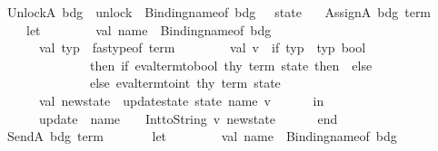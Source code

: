\begin{isabellebody}
\ \ {\isacharbar}{\kern0pt}\ UnlockA\ bdg\ {\isacharequal}{\kern0pt}{\isachargreater}{\kern0pt}\ {\isacharparenleft}{\kern0pt}{\isachardoublequote}{\kern0pt}unlock{\isacharunderscore}{\kern0pt}{\isachardoublequote}{\kern0pt}\ {\isacharcircum}{\kern0pt}\ Binding{\isachardot}{\kern0pt}name{\isacharunderscore}{\kern0pt}of\ bdg\ {\isacharcircum}{\kern0pt}\ {\isachardoublequote}{\kern0pt}{\isacharbang}{\kern0pt}{}{\isachardoublequote}{\kern0pt}{\isacharcomma}{\kern0pt}\ state{\isacharparenright}{\kern0pt}\isanewline
\ \ {\isacharbar}{\kern0pt}\ AssignA\ {\isacharparenleft}{\kern0pt}bdg{\isacharcomma}{\kern0pt}\ term{\isacharparenright}{\kern0pt}\ {\isacharequal}{\kern0pt}{\isachargreater}{\kern0pt}\isanewline
\ \ \ \ \ \ let\isanewline
\ \ \ \ \ \ \ \ val\ name\ {\isacharequal}{\kern0pt}\ Binding{\isachardot}{\kern0pt}name{\isacharunderscore}{\kern0pt}of\ bdg\isanewline
\ \ \ \ \ \ \ \ val\ typ\ {\isacharequal}{\kern0pt}\ fastype{\isacharunderscore}{\kern0pt}of\ term\isanewline
\ \ \ \ \ \ \ \ val\ v\ {\isacharequal}{\kern0pt}\ if\ typ\ {\isacharequal}{\kern0pt}\ {\isacharat}{\kern0pt}{\isacharbraceleft}{\kern0pt}typ\ bool{\isacharbraceright}{\kern0pt}\isanewline
\ \ \ \ \ \ \ \ \ \ \ \ \ \ \ \ then\ if\ eval{\isacharunderscore}{\kern0pt}term{\isacharunderscore}{\kern0pt}to{\isacharunderscore}{\kern0pt}bool\ thy\ term\ state\ then\ {}\ else\ {}\isanewline
\ \ \ \ \ \ \ \ \ \ \ \ \ \ \ \ else\ eval{\isacharunderscore}{\kern0pt}term{\isacharunderscore}{\kern0pt}to{\isacharunderscore}{\kern0pt}int\ thy\ term\ state\isanewline
\ \ \ \ \ \ \ \ val\ new{\isacharunderscore}{\kern0pt}state\ {\isacharequal}{\kern0pt}\ update{\isacharunderscore}{\kern0pt}state\ state\ name\ v\isanewline
\ \ \ \ \ \ in\isanewline
\ \ \ \ \ \ \ \ {\isacharparenleft}{\kern0pt}{\isachardoublequote}{\kern0pt}update{\isacharunderscore}{\kern0pt}{\isachardoublequote}{\kern0pt}\ {\isacharcircum}{\kern0pt}\ name\ {\isacharcircum}{\kern0pt}\ {\isachardoublequote}{\kern0pt}{\isacharbang}{\kern0pt}{\isachardoublequote}{\kern0pt}\ {\isacharcircum}{\kern0pt}\ Int{\isachardot}{\kern0pt}toString\ v{\isacharcomma}{\kern0pt}\ new{\isacharunderscore}{\kern0pt}state{\isacharparenright}{\kern0pt}\isanewline
\ \ \ \ \ \ end\isanewline
\ \ {\isacharbar}{\kern0pt}\ SendA\ {\isacharparenleft}{\kern0pt}bdg{\isacharcomma}{\kern0pt}\ term{\isacharparenright}{\kern0pt}\ {\isacharequal}{\kern0pt}{\isachargreater}{\kern0pt}\isanewline
\ \ \ \ \ \ let\isanewline
\ \ \ \ \ \ \ \ val\ name\ {\isacharequal}{\kern0pt}\ Binding{\isachardot}{\kern0pt}name{\isacharunderscore}{\kern0pt}of\ bdg\isanewline

\end{isabellebody}
